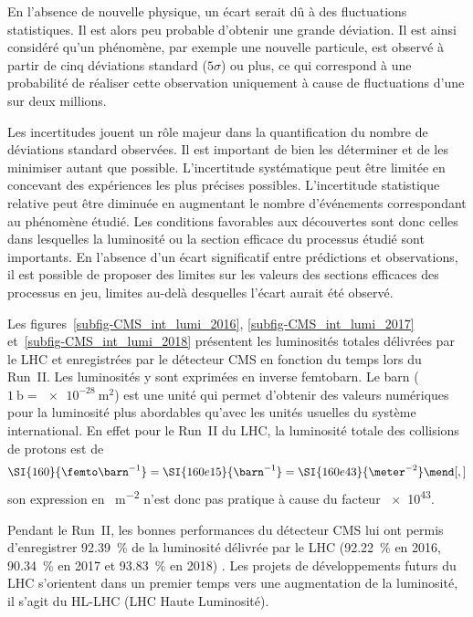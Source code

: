 En l'absence de nouvelle physique, un écart serait dû à des fluctuations statistiques.
Il est alors peu probable d'obtenir une grande déviation.
Il est ainsi considéré qu'un phénomène, par exemple une nouvelle particule, est observé à partir de cinq déviations standard ($5\sigma$) ou plus, ce qui correspond à une probabilité de réaliser cette observation uniquement à cause de fluctuations d'une sur deux millions.
\par
Les incertitudes jouent un rôle majeur dans la quantification du nombre de déviations standard observées.
Il est important de bien les déterminer et de les minimiser autant que possible.
L'incertitude systématique peut être limitée en concevant des expériences les plus précises possibles.
L'incertitude statistique relative peut être diminuée en augmentant le nombre d'événements correspondant au phénomène étudié.
Les conditions favorables aux découvertes sont donc celles dans lesquelles la luminosité ou la section efficace du processus étudié sont importants.
En l'absence d'un écart significatif entre prédictions et observations, il est possible de proposer des limites sur les valeurs des sections efficaces des processus en jeu, limites au-delà desquelles l'écart aurait été observé.
\par Les figures~\ref{subfig-CMS_int_lumi_2016}, \ref{subfig-CMS_int_lumi_2017} et~\ref{subfig-CMS_int_lumi_2018} présentent les luminosités totales délivrées par le LHC et enregistrées par le détecteur CMS en fonction du temps lors du Run~II.
Les luminosités y sont exprimées en inverse femtobarn.
Le barn ($\SI{1}{\barn}=\SI{e-28}{\meter^2}$) est une unité qui permet d'obtenir des valeurs numériques pour la luminosité plus abordables qu'avec les unités usuelles du système international.
En effet pour le Run~II du LHC, la luminosité totale des collisions de protons est de
\begin{equation}
\SI{160}{\femto\barn^{-1}} = \SI{160e15}{\barn^{-1}} = \SI{160e43}{\meter^{-2}}
\mend[,]
\end{equation}
son expression en \SI{}{\meter^{-2}} n'est donc pas pratique à cause du facteur \num{e43}.
\par Pendant le Run~II, les bonnes performances du détecteur CMS lui ont permis d'enregistrer \SI{92.39}{\%} de la luminosité délivrée par le LHC (\SI{92.22}{\%} en 2016, \SI{90.34}{\%} en 2017 et \SI{93.83}{\%} en 2018) \cite{CMS-PAS-LUM-17-001,CMS-PAS-LUM-17-004,CMS-PAS-LUM-18-002}.
Les projets de développements futurs du LHC s'orientent dans un premier temps vers une augmentation de la luminosité, il s'agit du \og HL-LHC \fg{} (LHC Haute Luminosité).
